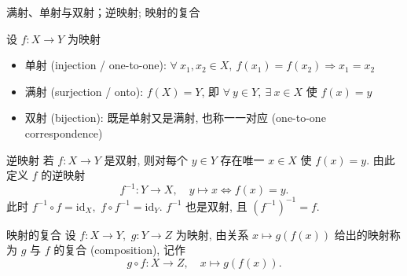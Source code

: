 
\begin{frame}{满射、单射与双射；逆映射; 映射的复合}

设 $f: X \to Y$ 为映射

\vspace{0.4em}

\begin{itemize}
\item \alert{单射} (injection / one-to-one): $\forall~x_1, x_2 \in X,\ f(x_1) = f(x_2) \Rightarrow x_1 = x_2$
\item \alert{满射} (surjection / onto): $f(X) = Y$, 即 $\forall~y \in Y,\ \exists~x \in X$ 使 $f(x) = y$
\item \alert{双射} (bijection): 既是单射又是满射, 也称\alert{一一对应} (one-to-one correspondence)
\end{itemize}

\pause
\vspace{0.5em}

\begin{block}{逆映射}
若 $f: X \to Y$ 是双射, 则对每个 $y \in Y$ 存在唯一 $x \in X$ 使 $f(x) = y$. 由此定义 $f$ 的\alert{逆映射}
\[
f^{-1}: Y \to X, \quad y \mapsto x \iff f(x) = y.
\]
此时 $f^{-1} \circ f = \mathrm{id}_X,$ $f \circ f^{-1} = \mathrm{id}_Y$. $f^{-1}$ 也是双射, 且 $(f^{-1})^{-1} = f$.
\end{block}

\pause
\vspace{0.5em}

\begin{block}{映射的复合}
设 $f: X \to Y,$ $g: Y \to Z$ 为映射, 由关系 $x \mapsto g(f(x))$ 给出的映射称为 $g$ 与 $f$ 的\alert{复合} (composition), 记作
\[
g \circ f: X \to Z, \quad x \mapsto g(f(x)).
\]
\end{block}

\noindent{}

\end{frame}


